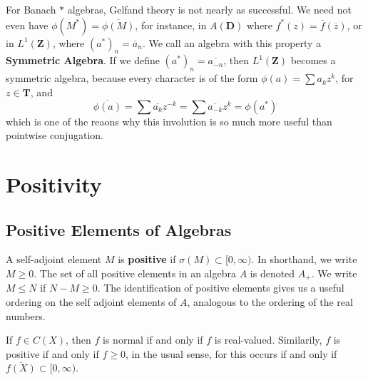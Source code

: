 For Banach $*$ algebras, Gelfand theory is not nearly as successful. We need not even have $\phi(M^*) = \overline{\phi(M)}$, for instance, in $A(\mathbf{D})$ where $f^*(z) = \overline{f}(\overline{z})$, or in $L^1(\mathbf{Z})$, where $(a^*)_n = \overline{a}_n$. We call an algebra with this property a {\bf Symmetric Algebra}. If we define $(a^*)_n = \overline{a_{-n}}$, then $L^1(\mathbf{Z})$ becomes a symmetric algebra, because every character is of the form $\phi(a) = \sum a_k z^k$, for $z \in \mathbf{T}$, and
%
\[ \overline{\phi(a)} = \sum \overline{a_k} z^{-k} = \sum \overline{a_{-k}} z^k = \phi(a^*) \]
%
which is one of the reaons why this involution is so much more useful than pointwise conjugation.




\section{Positivity}

\subsection{Positive Elements of Algebras}

A self-adjoint element $M$ is {\bf positive} if $\sigma(M) \subset [0, \infty)$. In shorthand, we write $M \geq 0$. The set of all positive elements in an algebra $A$ is denoted $A_+$. We write $M \leq N$ if $N - M \geq 0$. The identification of positive elements gives us a useful ordering on the self adjoint elements of $A$, analogous to the ordering of the real numbers.

\begin{example}
    If $f \in C(X)$, then $f$ is normal if and only if $f$ is real-valued. Similarily, $f$ is positive if and only if $f \geq 0$, in the usual sense, for this occurs if and only if $\overline{f(X)} \subset [0,\infty)$.
\end{example}

